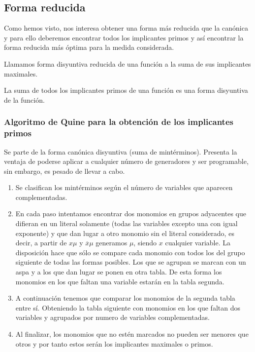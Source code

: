 \subsection{Forma reducida}
Como hemos visto, nos interesa obtener una forma más reducida que la canónica y para ello deberemos encontrar todos los implicantes primos y así encontrar la forma reducida más óptima para la medida considerada.
\begin{ndef}
    Llamamos forma disyuntiva reducida de una función a la suma de sus implicantes maximales.
\end{ndef}
\begin{nth}
    La suma de todos los implicantes primos de una función es una forma disyuntiva de la función.
\end{nth}

\subsubsection{Algoritmo de Quine para la obtención de los implicantes primos}
Se parte de la forma canónica disyuntiva (suma de mintérminos). Presenta la ventaja de poderse aplicar a cualquier número de generadores y ser programable, sin embargo, es pesado de llevar a cabo.
\begin{enumerate}
    \item Se clasifican los mintérminos según el número de variables que aparecen complementadas.
    \item En cada paso intentamos encontrar dos monomios en grupos adyacentes que difieran en un literal solamente
          (todas las variables excepto una con igual exponente) y que dan lugar a otro monomio sin el literal considerado,
          es decir, a partir de $x\mu$ y $\overline{x}\mu$ generamos $\mu$, siendo $x$ cualquier variable. La disposición hace que sólo se compare
          cada monomio con todos los del grupo siguiente de todas las formas posibles. Los que se agrupan se marcan
          con un aspa y a los que dan lugar se ponen en otra tabla. De esta forma los monomios en los que faltan una
          variable estarán en la tabla segunda.
    \item A continuación tenemos que comparar los monomios de la segunda tabla entre sí. Obteniendo la tabla siguiente con monomios en los que faltan dos variables y agrupados por numero de variables complementadas.
    \item Al finalizar, los monomios que no estén marcados no pueden ser menores que otros y por tanto estos serán los implicantes maximales o primos.
\end{enumerate}

